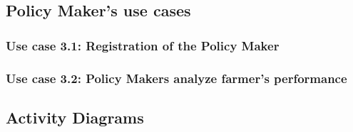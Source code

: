 \documentclass[10pt]{report}
\begin{document}
\subsection{Policy Maker's use cases}
\subsubsection{Use case 3.1: Registration of the Policy Maker}

\subsubsection{Use case 3.2: Policy Makers analyze farmer’s performance}

\subsection{Activity Diagrams}
\end{document}

